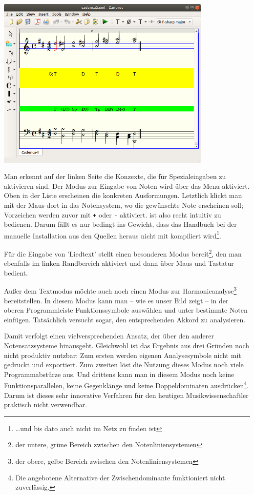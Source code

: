 \begin{center}
\includegraphics[width=0.8\textwidth]{frontends/canorus/cadenca2-canorus}
\end{center}

Man erkennt auf der linken Seite die Konzexte, die für Spezialeingaben zu
aktivieren sind. Der Modus zur Eingabe von Noten wird über das Menu aktiviert.
Oben in der Liste erscheinen die konkreten Ausformungen. Letztlich klickt man
mit der Maus dort in das Notensystem, wo die gewünschte Note erscheinen soll;
Vorzeichen werden zuvor mit \texttt{+} oder \texttt{-} aktiviert. 
ist also recht intuitiv zu bedienen. Darum fällt es nur bedingt ins Gewicht, dass
das Handbuch bei der manuelle Installation aus den Quellen heraus nicht mit
kompiliert wird\footnote{\ldots und bis dato auch nicht im Netz zu finden ist}.

Für die Eingabe von 'Liedtext' stellt  einen besonderen Modus
bereit\footnote{der untere, grüne Bereich zwischen den Notenliniensystemen}, den
man ebenfalls im linken Randbereich aktiviert und dann über Maus und Tastatur
bedient.

Außer dem Textmodus möchte  auch noch einen Modus zur
Harmonieanalyse\footnote{der obere, gelbe Bereich zwischen den
Notenliniensystemen} bereitstellen. In diesem Modus kann man -- wie es unser
Bild zeigt -- in der oberen Programmleiste Funktionssymbole auswählen und unter
bestimmte Noten einfügen. Tatsächlich versucht  sogar, den
entsprechenden Akkord zu analysieren.

Damit verfolgt  einen vielversprechenden Ansatz, der über den
anderer Notensatzsysteme hinausgeht. Gleichwohl ist das Ergebnis aus drei
Gründen noch nicht produktiv nutzbar: Zum ersten werden  eigenen
Analysesymbole nicht mit gedruckt und exportiert. Zum zweiten löst die Nutzung
dieses Modus noch viele Programmabstürze aus. Und drittens kann man in diesem
Modus noch keine Funktionsparallelen, keine Gegenklänge und keine
Doppeldominaten ausdrücken\footnote{Die angebotene Alternative der
Zwischendominante funktioniert nicht zuverlässig.}. Darum ist dieses sehr
innovative Verfahren für den heutigen Musikwissenschaftler praktisch nicht
verwendbar.

